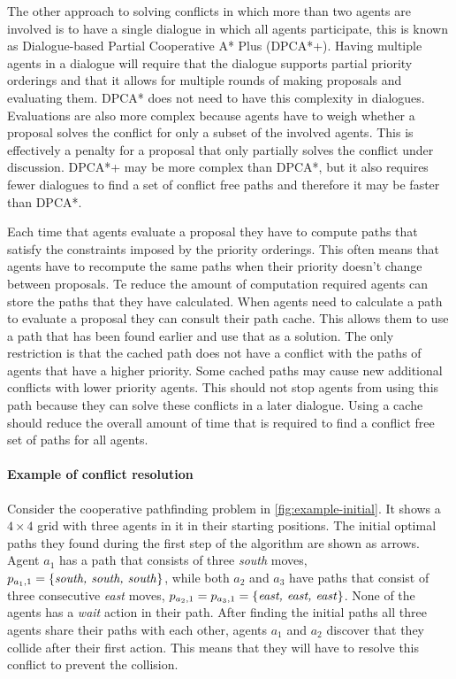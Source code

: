 The other approach to solving conflicts in which more than two agents are 
involved is to have a single dialogue in which all agents
participate, this is known as Dialogue-based Partial Cooperative A* Plus
(DPCA*+). Having multiple agents in a dialogue will require that the dialogue
supports partial priority orderings and that it allows for multiple rounds of
making proposals and evaluating them. DPCA* does not need to have this
complexity in dialogues. Evaluations are also more complex because agents have 
to weigh whether a proposal solves the conflict for only a subset of the 
involved agents. This is effectively a penalty for a proposal that only 
partially solves the conflict under discussion.
DPCA*+ may be more complex than DPCA*, but it also
requires fewer dialogues to find a set of conflict free paths and therefore it
may be faster than DPCA*.

Each time that agents evaluate a proposal they have to compute paths that
satisfy the constraints imposed by the priority orderings. This often means
that agents have to recompute the same paths when their priority doesn't change
between proposals. Te reduce the amount of computation required agents can
store the paths that they have calculated. When agents need to calculate a path
to evaluate a proposal they can consult their path cache. This allows them to
use a path that has been found earlier and use that as a solution. The only
restriction is that the cached path does not have a conflict with the paths of
agents that have a higher priority. Some cached paths may cause new additional
conflicts with lower priority agents. This should not stop agents from using
this path because they can solve these conflicts in a later dialogue. Using a
cache should reduce the overall amount of time that is required to find a
conflict free set of paths for all agents.

\paragraph{Example of conflict resolution} Consider the cooperative pathfinding
problem in \autoref{fig:example-initial}. It shows a $4 \times 4$ grid with
three agents in it in their starting positions. The initial optimal paths they
found during the first step of the algorithm are shown as arrows.
Agent $a_1$ has a path that consists of three \emph{south} moves, $p_{a_{1},1}
= \{\text{\emph{south, south, south}}\}$, while both $a_2$ and $a_3$ have paths
that consist of three consecutive \emph{east} moves, $p_{a_2,1} = p_{a_3,1} =
\{\text{\emph{east, east, east}}\}$. None of the agents has a \emph{wait}
action in their path. After finding the initial paths all three agents share
their paths with each other, agents $a_1$ and $a_2$ discover that they collide
after their first action. This means that they will have to resolve this
conflict to prevent the collision.

